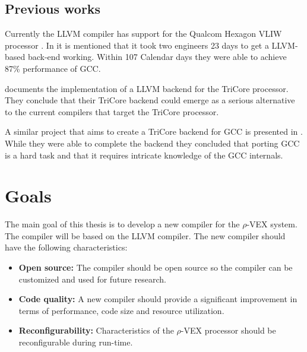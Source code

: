 \subsection{Previous works}
Currently the LLVM compiler has support for the Qualcom Hexagon VLIW processor \cite{10.1109/MM.2014.12}. In \cite{Simpson:2011qc} it is mentioned that it took two engineers 23 days to get a LLVM-based back-end working. Within 107 Calendar days they were able to achieve 87\% performance of GCC.

\cite{Erhardt:2009sy} documents the implementation of a LLVM backend for the TriCore processor. They conclude that their TriCore backend could emerge as a serious alternative to the current compilers that target the TriCore processor.

A similar project that aims to create a TriCore backend for GCC is presented in \cite{Antani:2014om}. While they were able to complete the backend they concluded that porting GCC is a hard task and that it requires intricate knowledge of the GCC internals.



\section{Goals}
The main goal of this thesis is to develop a new compiler for the $\rho$-VEX system. The compiler will be based on the LLVM compiler. The new compiler should have the following characteristics:

\begin{itemize}
	\item \textbf{Open source:} The compiler should be open source so the compiler can be customized and used for future research.
	\item \textbf{Code quality:} A new compiler should provide a significant improvement in terms of performance, code size and resource utilization.
	\item \textbf{Reconfigurability:} Characteristics of the $\rho$-VEX processor should be reconfigurable during run-time.
\end{itemize}

